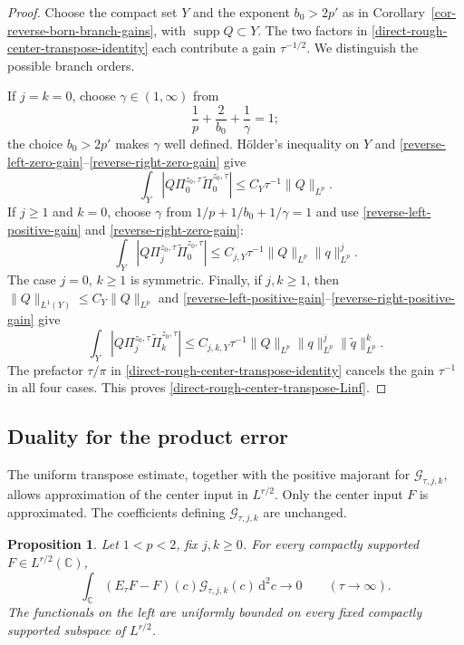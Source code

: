 \documentclass[a4paper,11pt]{article}
\newcommand{\C}{\mathbb{C}}
\newcommand{\dd}{\,\text{d}}
\theoremstyle{plain}
\newtheorem{prop}[thm]{Proposition}
\theoremstyle{definition}
\theoremstyle{remark}
\begin{document}
\begin{proof}
Choose the compact set $Y$ and the exponent $b_0>2p'$ as in
Corollary~\ref{cor-reverse-born-branch-gains}, with
$\operatorname{supp}Q\subset Y$.  The two factors in
\eqref{direct-rough-center-transpose-identity} each contribute a gain
$\tau^{-1/2}$.  We distinguish the possible branch orders.

If $j=k=0$, choose $\gamma\in(1,\infty)$ from
\[
 \frac1p+\frac2{b_0}+\frac1\gamma=1;
\]
the choice $b_0>2p'$ makes $\gamma$ well defined.  H\"older's inequality on $Y$
and \eqref{reverse-left-zero-gain}--\eqref{reverse-right-zero-gain} give
\[
 \int_Y|Q \Pi_0^{z_0,\tau}\widetilde\Pi_0^{z_0,\tau}|
 \leq C_Y\tau^{-1}\|Q\|_{L^p}.
\]
If $j\geq1$ and $k=0$, choose $\gamma$ from
$1/p+1/b_0+1/\gamma=1$ and use
\eqref{reverse-left-positive-gain} and \eqref{reverse-right-zero-gain}:
\[
 \int_Y|Q \Pi_j^{z_0,\tau}\widetilde\Pi_0^{z_0,\tau}|
 \leq C_{j,Y}\tau^{-1}\|Q\|_{L^p}\|q\|_{L^p}^j.
\]
The case $j=0$, $k\geq1$ is symmetric.  Finally, if $j,k\geq1$, then
$\|Q\|_{L^1(Y)}\leq C_Y\|Q\|_{L^p}$ and
\eqref{reverse-left-positive-gain}--\eqref{reverse-right-positive-gain} give
\[
 \int_Y|Q \Pi_j^{z_0,\tau}\widetilde\Pi_k^{z_0,\tau}|
 \leq C_{j,k,Y}\tau^{-1}
 \|Q\|_{L^p}\|q\|_{L^p}^j\|\widetilde q\|_{L^p}^k.
\]
The prefactor $\tau/\pi$ in
\eqref{direct-rough-center-transpose-identity} cancels the gain $\tau^{-1}$
in all four cases.  This proves
\eqref{direct-rough-center-transpose-Linf}.
\end{proof}

\subsection{Duality for the product error}\label{subsec-product-duality}

The uniform transpose estimate, together with the positive majorant for $\mathcal G_{\tau,j,k}$, allows approximation of the center input in $L^{r/2}$. Only the center input $F$ is approximated. The coefficients defining $\mathcal G_{\tau,j,k}$ are unchanged.

\begin{prop}
\label{prop-direct-product-error-duality}
Let $1<p<2$, fix $j,k\geq0$.  For every compactly supported $F\in L^{r/2}(\C)$,
\begin{equation}\label{direct-product-error-duality-conclusion}
 \int_{\C}(E_\tau F-F)(c)\mathcal G_{\tau,j,k}(c)\dd^2c
 \longrightarrow0
 \qquad (\tau\to\infty).
\end{equation}
The functionals on the left are uniformly bounded on every fixed
compactly supported subspace of $L^{r/2}$.
\end{prop}
\end{document}
